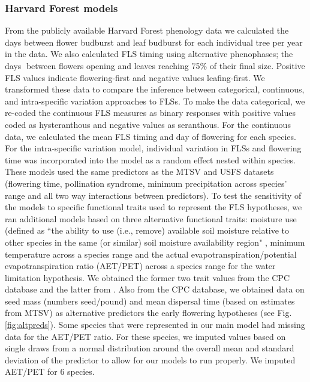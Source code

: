 \documentclass[11pt]{article}
\begin{document}
  \subsubsection*{Harvard Forest models}
  \noindnent From the publicly available Harvard Forest phenology data \citep{OKeefe2015} we calculated the days between flower budburst and leaf budburst for each individual tree per year in the data. We also calculated FLS timing using alternative phenophases; the days between flowers opening and leaves reaching 75\% of their final size. Positive FLS values indicate flowering-first and negative values leafing-first. We transformed these data to compare the inference between categorical, continuous, and intra-specific variation approaches to FLSs. To make the data categorical, we re-coded the continuous FLS measures as binary responses with positive values coded as hysteranthous and negative values as seranthous. For the continuous data, we calculated the mean FLS timing and day of flowering for each species. For the intra-specific variation model, individual variation in FLSs and flowering time was incorporated into the model as a random effect nested within species. These models used the same predictors as the MTSV and USFS datasets (flowering time, pollination syndrome, minimum precipitation across species' range and all two way interactions between predictors). To test the sensitivity of the models to specific functional traits used to represent the FLS hypotheses, we ran additional models based on three alternative functional traits: moisture use (defined as ``the ability to use (i.e., remove) available soil moisture relative to other species in the same (or similar) soil moisture availability region" \citep{usdancrs}, minimum temperature across a species range and the actual evapotranspiration/potential evapotranspiration ratio (AET/PET) across a species range for the water limitation hypothesis. We obtained the former two trait values from the CPC database and the latter from \citet{Thomspson2012}. Also from the CPC database, we obtained data on seed mass (numbers seed/pound) and mean dispersal time (based on estimates from MTSV) as alternative predictors the early flowering hypotheses (see Fig. \ref{fig:altpreds}). Some species that were represented in our main model had missing data for the AET/PET ratio. For these species, we imputed values based on single draws from a normal distribution around the overall mean and standard deviation of the predictor to allow for our models to run properly. We imputed AET/PET for 6 species.\\ 
  
\end{document}
